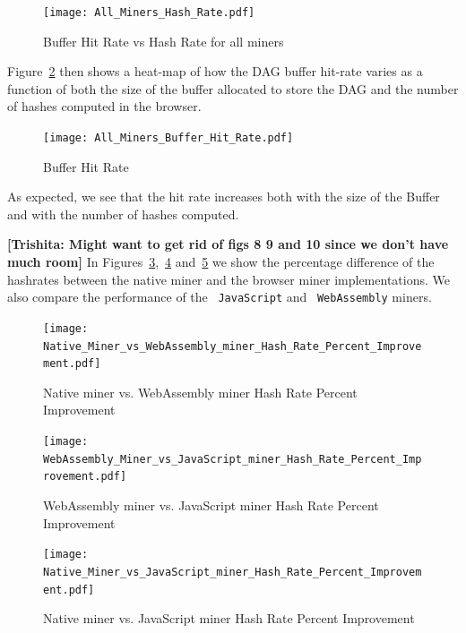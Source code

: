 \documentclass[runningheads]{llncs}
\newcommand{\trishita}[1]{{\color{magenta}\bfseries[Trishita: #1]}}
\begin{document}
\begin{figure}[h]
\centering
\texttt{[image: All\_Miners\_Hash\_Rate.pdf]}
\caption{\label{fig:bufferRatevsHashRate} Buffer Hit Rate vs Hash Rate for all miners}
\end{figure}

Figure~\ref{fig:bufferRateHM} then shows a heat-map of how the DAG buffer hit-rate varies as a function of both the size of the buffer allocated to store the DAG and the number of hashes computed in the browser. 

\begin{figure}[H]
\centering
\texttt{[image: All\_Miners\_Buffer\_Hit\_Rate.pdf]}
\caption{\label{fig:bufferRateHM} Buffer Hit Rate}
\end{figure}

As expected, we see that the hit rate increases both with the size of the Buffer and with the number of hashes computed.

\trishita{Might want to get rid of figs 8 9 and 10 since we don't have much room}
In Figures~\ref{fig:NativeWebAsm},~\ref{fig:WebAsmJS} and~\ref{fig:NativeJS} we show the percentage difference of the hashrates between the native miner and the browser miner implementations. We also compare the performance of the ~\verb|JavaScript| and ~\verb|WebAssembly|  miners.

\begin{figure}[h]
\centering
\texttt{[image: Native\_Miner\_vs\_WebAssembly\_miner\_Hash\_Rate\_Percent\_Improvement.pdf]}
\caption{\label{fig:NativeWebAsm} Native miner vs. WebAssembly miner Hash Rate Percent Improvement}
\end{figure}

\begin{figure}[h]
\centering
\texttt{[image: WebAssembly\_Miner\_vs\_JavaScript\_miner\_Hash\_Rate\_Percent\_Improvement.pdf]}
\caption{\label{fig:WebAsmJS} WebAssembly miner vs. JavaScript miner Hash Rate Percent Improvement}
\end{figure}

\begin{figure}[h]
\centering
\texttt{[image: Native\_Miner\_vs\_JavaScript\_miner\_Hash\_Rate\_Percent\_Improvement.pdf]}
\caption{\label{fig:NativeJS} Native miner vs. JavaScript miner Hash Rate Percent Improvement}
\end{figure}


\end{document}
